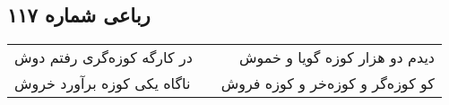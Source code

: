\begin{center}
\section*{رباعی شماره ۱۱۷}
\label{sec:sh117}
\begin{longtable}{l p{0.5cm} r}
در کارگه کوزه‌گری رفتم دوش
&&
دیدم دو هزار کوزه گویا و خموش
\\
ناگاه یکی کوزه برآورد خروش
&&
کو کوزه‌گر و کوزه‌خر و کوزه فروش
\\
\end{longtable}
\end{center}
